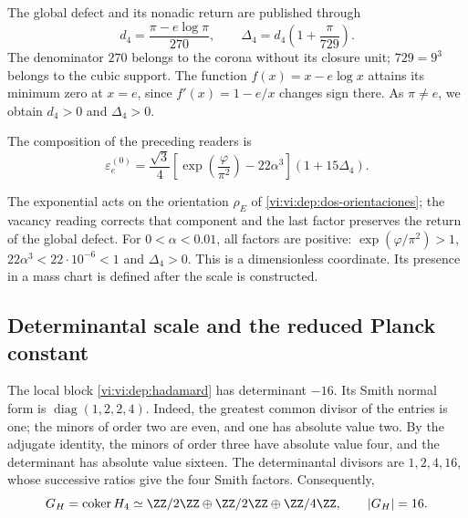 The global defect and its nonadic return are published through
\begin{equation}
 d_4=\frac{\pi-e\log\pi}{270},\qquad
 \Delta_4=d_4\left(1+\frac{\pi}{729}\right).
 \label{vi:vi:dep:delta4}
\end{equation}
The denominator \(270\) belongs to the corona without its closure
unit; \(729=9^3\) belongs to the cubic support. The function
\(f(x)=x-e\log x\) attains its minimum zero at \(x=e\), since
\(f'(x)=1-e/x\) changes sign there. As \(\pi\ne e\),
we obtain \(d_4>0\) and \(\Delta_4>0\).

\begin{definition}
\label{vi:vi:dep:electron-basal}
The composition of the preceding readers is
\begin{equation}
 \varepsilon_e^{(0)}=
 \frac{\sqrt3}{4}
 \left[\exp\left(\frac{\varphi}{\pi^2}\right)-22\alpha^3\right]
 (1+15\Delta_4).
 \label{vi:vi:dep:formula-basal}
\end{equation}
\end{definition}
The exponential acts on the orientation \(\rho_E\) of
\eqref{vi:vi:dep:dos-orientaciones}; the vacancy reading corrects that
component and the last factor preserves the return of the global defect.
For \(0<\alpha<0.01\), all factors are positive:
\(\exp(\varphi/\pi^2)>1\), \(22\alpha^3<22\cdot10^{-6}<1\)
and \(\Delta_4>0\). This is a dimensionless coordinate. Its presence
in a mass chart is defined after the scale is constructed.

\subsection{Determinantal scale and the reduced Planck constant}
\label{vi:vi:dep:planck}

The local block \eqref{vi:vi:dep:hadamard} has determinant \(-16\).
Its Smith normal form is \(\operatorname{diag}(1,2,2,4)\).
Indeed, the greatest common divisor of the entries is one; the minors of
order two are even, and one has absolute value two. By the adjugate identity,
the minors of order three have absolute value four,
and the determinant has absolute value sixteen. The determinantal
divisors are \(1,2,4,16\), whose successive ratios give the
four Smith factors. Consequently,
\begin{equation}
 G_H=\operatorname{coker}H_4
 \simeq\ZZ/2\ZZ\oplus\ZZ/2\ZZ\oplus\ZZ/4\ZZ,
 \qquad |G_H|=16.
 \label{vi:vi:dep:conucleo}
\end{equation}

